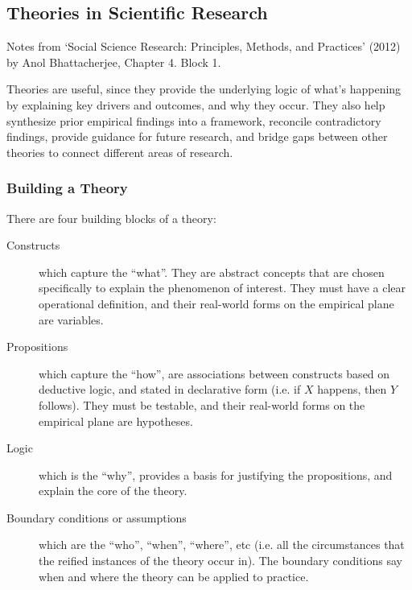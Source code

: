 \subsection{Theories in Scientific Research}
\begin{flushright}
  \scriptsize Notes from `Social Science Research: Principles, Methods, and
  Practices' (2012) by Anol Bhattacherjee, Chapter 4. Block 1.
\end{flushright}



Theories are useful, since they provide the underlying logic of what's
happening by explaining key drivers and outcomes, and why they
occur. They also help synthesize prior empirical findings into a
framework, reconcile contradictory findings, provide guidance for
future research, and bridge gaps between other theories to connect
different areas of research.

\subsubsection{Building a Theory}


There are four building blocks of a theory:
\begin{description}
  \item[Constructs] which capture the ``what''. They are abstract
    concepts that are chosen specifically to explain the phenomenon of
    interest. They must have a clear operational definition, and their
    real-world forms on the empirical plane  are variables.
  \item[Propositions] which capture the ``how'', are associations
    between constructs based on deductive logic, and stated in
    declarative form (i.e. if $X$ happens, then $Y$ follows). They
    must be testable, and their real-world forms on the empirical plane
    are hypotheses.
  \item[Logic] which is the ``why'', provides a basis for justifying
    the propositions, and explain the core of the theory.
  \item[Boundary conditions or assumptions] which are the ``who'',
    ``when'', ``where'', etc (i.e. all the circumstances that the
    reified instances of the theory occur in). The boundary conditions
    say when and where the theory can be applied to practice.
\end{description}

